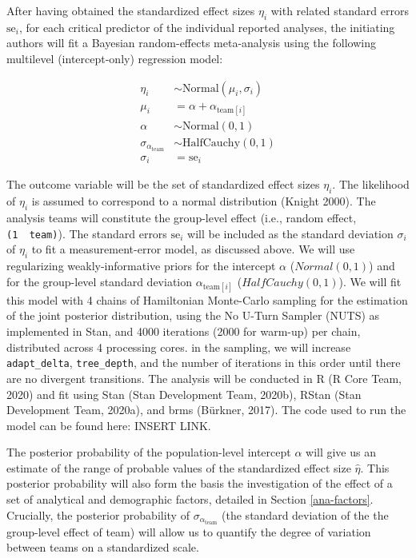 \documentclass[
  english,
  man,floatsintext]{apa6}
\begin{document}
After having obtained the standardized effect sizes \(\eta_i\) with related standard errors \(\text{se}_i\), for each critical predictor of the individual reported analyses, the initiating authors will fit a Bayesian random-effects meta-analysis using the following multilevel (intercept-only) regression model:

\[
\begin{aligned}
\eta_i      & \sim \text{Normal}(\mu_i, \sigma_i) \\
\mu_i       & = \alpha + \alpha_{\text{team}[i]} \\
\alpha      & \sim \text{Normal}(0, 1) \\
\sigma_{\alpha_{\text{team}}} & \sim \text{HalfCauchy}(0, 1) \\
\sigma_i    & = \text{se}_i
\end{aligned}
\]

The outcome variable will be the set of standardized effect sizes \(\eta_i\).
The likelihood of \(\eta_i\) is assumed to correspond to a normal distribution (Knight 2000).
The analysis teams will constitute the group-level effect (i.e., random effect, \texttt{(1\ \textbar{}\ team)}).
The standard errors \(\text{se}_i\) will be included as the standard deviation \(\sigma_i\) of \(\eta_i\) to fit a measurement-error model, as discussed above.
We will use regularizing weakly-informative priors for the intercept \(\alpha\) (\(Normal(0, 1)\)) and for the group-level standard deviation \(\alpha_{\text{team}[i]}\) (\(HalfCauchy(0, 1)\)).
We will fit this model with 4 chains of Hamiltonian Monte-Carlo sampling for the estimation of the joint posterior distribution, using the No U-Turn Sampler (NUTS) as implemented in Stan, and 4000 iterations (2000 for warm-up) per chain, distributed across 4 processing cores.
 in the sampling, we will increase \texttt{adapt\_delta}, \texttt{tree\_depth}, and the number of iterations in this order until there are no divergent transitions.
The analysis will be conducted in R (R Core Team, 2020) and fit using Stan (Stan Development Team, 2020b), RStan (Stan Development Team, 2020a), and brms (Bürkner, 2017).
The code used to run the model can be found here: INSERT LINK.

The posterior probability of the population-level intercept \(\alpha\) will give us an estimate of the range of probable values of the standardized effect size \(\hat{\eta}\).
This posterior probability will also form the basis  the investigation of the effect of a set of analytical and demographic factors, detailed in Section \ref{ana-factors}.
Crucially, the posterior probability of \(\sigma_{\alpha_{\text{team}}}\) (the standard deviation of the the group-level effect of team) will allow us to quantify the degree of variation between teams on a standardized scale.
\end{document}
